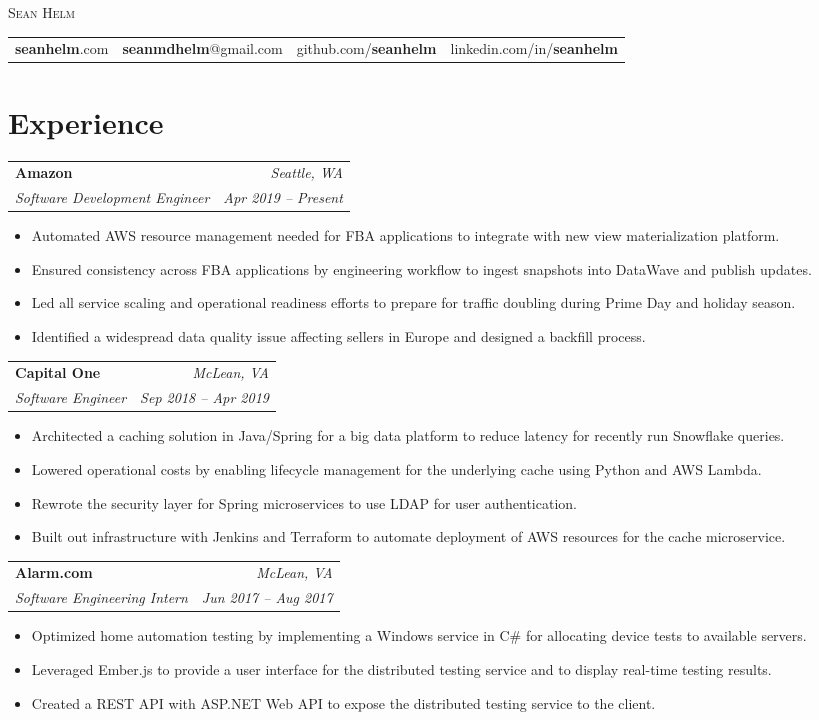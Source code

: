 \documentclass[letterpaper,10pt]{article}
\makeatletter
\newcommand{\resumeSectionBegin}[1]{\section{#1}}
\newcommand{\resumeItemBegin}{\vspace{1pt}}
\newcommand{\resumeItemEnd}{\vspace{10pt}}
\newcommand{\nameinfo}[5]{
  \begin{center}
  {\Huge\textsc{#1}}\vspace{2mm}\break
  \addtolength{\tabcolsep}{6pt} 
  \begin{tabular}{@{}c|c|c|c}
  #2 & #3 & #4 & #5
  \vspace{15pt}
  \end{tabular}
  \addtolength{\tabcolsep}{-6pt} 
  \end{center}
}
\newcommand{\resumeItemHeading}[4]{
  \begin{tabular*}{\textwidth}[t]{l@{\extracolsep{\fill}}r}
    {\large \textbf{#1}} & \textsl{#3}\vspace{3pt} \\
    {\large \textsl{#2}} & \textsl{#4} \\
  \end{tabular*}
}
\makeatother
\begin{document}
\nameinfo{Sean Helm}{\textbf{seanhelm}.com}{\textbf{seanmdhelm}@gmail.com}{github.com/\textbf{seanhelm}}{linkedin.com/in/\textbf{seanhelm}}


\resumeSectionBegin{Experience}
  \resumeItemBegin
    \resumeItemHeading{Amazon}{Software Development Engineer}{Seattle, WA}{Apr 2019 -- Present}
    \begin{itemize}
      \item Automated AWS resource management needed for FBA applications to integrate with new view materialization platform.
      \item Ensured consistency across FBA applications by engineering workflow to ingest snapshots into DataWave and publish updates.
      \item Led all service scaling and operational readiness efforts to prepare for traffic doubling during Prime Day and holiday season.
      \item Identified a widespread data quality issue affecting sellers in Europe and designed a backfill process.
    \end{itemize}
  \resumeItemEnd
  \resumeItemBegin
    \resumeItemHeading{Capital One}{Software Engineer}{McLean, VA}{Sep 2018 -- Apr 2019}
    \begin{itemize}
      \item Architected a caching solution in Java/Spring for a big data platform to reduce latency for recently run Snowflake queries.
      \item Lowered operational costs by enabling lifecycle management for the underlying cache using Python and AWS Lambda.
      \item Rewrote the security layer for Spring microservices to use LDAP for user authentication.
      \item Built out infrastructure with Jenkins and Terraform to automate deployment of AWS resources for the cache microservice.
    \end{itemize}
  \resumeItemEnd
  \resumeItemBegin
    \resumeItemHeading{Alarm.com}{Software Engineering Intern}{McLean, VA}{Jun 2017 -- Aug 2017}
    \begin{itemize}
      \item Optimized home automation testing by implementing a Windows service in C\# for allocating device tests to available servers.
      \item Leveraged Ember.js to provide a user interface for the distributed testing service and to display real-time testing results.
      \item Created a REST API with ASP.NET Web API to expose the distributed testing service to the client.
    \end{itemize}
\end{document}
